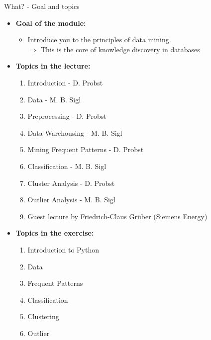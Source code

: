 \begin{frame}{What? - Goal and topics}
	\begin{itemize}
		\item \textbf{Goal of the module:}
		      \begin{itemize}
			      \item Introduce you to the principles of data mining. \\
			            $\Rightarrow$ This is the core of knowledge discovery in databases
		      \end{itemize}
		\item \textbf{Topics in the lecture:}
		      \vspace*{-1\multicolsep}
		      \begin{multicols}{2}
			      \begin{enumerate}
				      \item Introduction {\color{gray} - D. Probst}
				      \item Data {\color{gray} - M. B. Sigl}
				      \item Preprocessing {\color{gray} - D. Probst}
				      \item Data Warehousing {\color{gray} - M. B. Sigl}
				      \item Mining Frequent Patterns {\color{gray} - D. Probst}
				      \item Classification {\color{gray} - M. B. Sigl}
				      \item Cluster Analysis {\color{gray} - D. Probst}
				      \item Outlier Analysis {\color{gray} - M. B. Sigl}
				      \item {\color{gray}Guest lecture by Friedrich-Claus Grüber (Siemens Energy)}
			      \end{enumerate}
		      \end{multicols}
		      \vspace*{-1\multicolsep}
		\item \textbf{Topics in the exercise:}
		      \vspace*{-1\multicolsep}
		      \begin{multicols}{2}
			      \begin{enumerate}
				      \item Introduction to Python
				      \item Data
				      \item Frequent Patterns
				      \item Classification
				      \item Clustering
				      \item Outlier
			      \end{enumerate}
		      \end{multicols}
		      \
	\end{itemize}
\end{frame}

